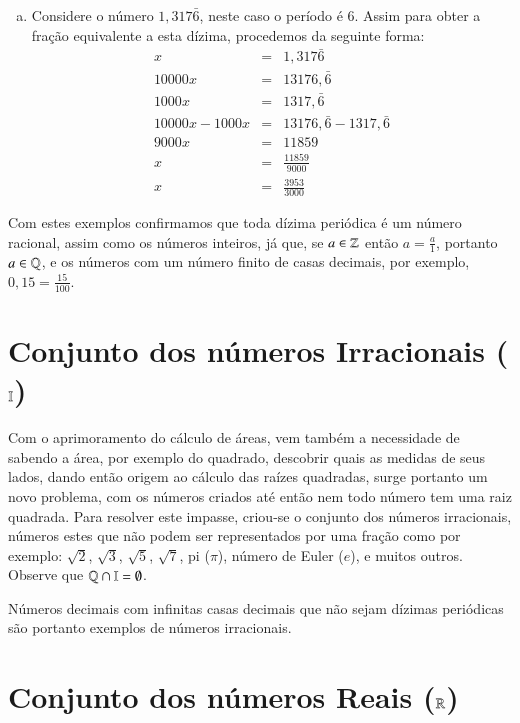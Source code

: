 \begin{exem}
\begin{enumerate}[a)]
   \item Considere o número $1,317\bar{6}$, neste caso o período é $6$. Assim para obter a fração equivalente a esta dízima, procedemos da seguinte forma:
   \begin{eqnarray*}
    x &=& 1,317\bar{6} \\
    10000 x &=& 13176, \bar{6} \\
    1000 x &=& 1317,\bar{6}\\
    10000 x - 1000 x &=& 13176, \bar{6} - 1317,\bar{6}\\
    9000 x &=& 11859 \\
    x &=& \frac{11859}{9000}\\
    x &=& \frac{3953}{3000}
   \end{eqnarray*}

  \end{enumerate}

 \end{exem}

Com estes exemplos confirmamos que toda dízima periódica é um número racional, assim como os números inteiros, já que, se $a \in \mathbb{Z}$ então $a=\frac{a}{1}$, portanto $a \in \mathbb{Q}$, e os números com um número finito de casas decimais, por exemplo, $0,15= \frac{15}{100}$.


\section{Conjunto dos números Irracionais (\texorpdfstring{$\mathbb{I}$}{I})}

Com o aprimoramento do cálculo de áreas, vem também a necessidade de sabendo a área, por exemplo do quadrado, descobrir quais as medidas de seus lados, dando então origem ao cálculo das raízes quadradas, surge portanto um novo problema, com os números criados até então nem todo número tem uma raiz quadrada. Para resolver este impasse, criou-se o conjunto dos números irracionais, números estes que não podem ser representados por uma fração como por exemplo: $\sqrt{2}$, $\sqrt{3}$, $\sqrt{5}$, $\sqrt{7}$, pi ($\pi$), número de Euler ($e$), e muitos outros. Observe que $\mathbb{Q} \cap \mathbb{I} = \emptyset$.

Números decimais com infinitas casas decimais que não sejam dízimas periódicas são portanto exemplos de números irracionais.

\section{Conjunto dos números Reais (\texorpdfstring{$\mathbb{R}$}{R})}

